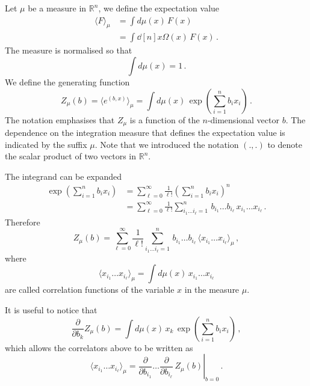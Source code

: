 \documentclass[notes.tex]{subfiles}
\begin{document}
Let $\mu$ be a measure in $\mathbb{R}^n$, we define the expectation value
\begin{align}
  \label{eq:ExpValMu}
  \langle F \rangle_\mu & = \int d\mu(x)\, F(x)                 \\
                        & = \int \dd[n]{x} \Omega(x)\, F(x)\, .
\end{align}
The measure is normalised so that
\begin{equation}
  \label{eq:MeasureNorm}
  \int d\mu(x) = 1\, .
\end{equation}
We define the generating function
\begin{equation}
  \label{eq:ZGenFunc}
  Z_\mu(b) = \langle e^{(b,x)}\rangle_\mu =
  \int d\mu(x)\, \exp\left(
  \sum_{i=1}^n b_i x_i
  \right)\, .
\end{equation}
The notation emphasises that $Z_\mu$ is a function of the $n$-dimensional vector $b$. The dependence on the integration measure that defines the expectation value is indicated by the suffix $\mu$. Note that we introduced the notation $(.,.)$ to denote the scalar product of two vectors in $\mathbb{R}^n$.

The integrand can be expanded
\begin{align}
  \exp\left(
  \sum_{i=1}^n b_i x_i
  \right) & =
  \sum_{\ell=0}^\infty \frac{1}{\ell!} \left(
  \sum_{i=1}^n b_i x_i
  \right)^n                                        \\
          & = \sum_{\ell=0}^\infty \frac{1}{\ell!}
  \sum_{i_1 \ldots i_\ell=1}^n \, b_{i_1} \ldots b_{i_\ell}\,
  x_{i_1} \ldots x_{i_\ell}\, .
\end{align}
Therefore
\begin{equation}
  \label{eq:ZExp}
  Z_\mu(b) =  \sum_{\ell=0}^\infty \frac{1}{\ell!}
  \sum_{i_1 \ldots i_\ell=1}^n \, b_{i_1} \ldots b_{i_\ell}\,
  \langle x_{i_1} \ldots x_{i_\ell}\rangle_\mu\, ,
\end{equation}
where
\begin{equation}
  \label{eq:XCorrel}
  \langle x_{i_1} \ldots x_{i_\ell}\rangle_\mu =
  \int d\mu(x)\, x_{i_1} \ldots x_{i_\ell}
\end{equation}
are called correlation functions of the variable $x$ in the measure $\mu$.

It is useful to notice that
\begin{equation}
  \label{eq:DiffGenFunct}
  \frac{\partial}{\partial b_k} Z_\mu(b) = \int d\mu(x)\, x_k\, \exp\left(
  \sum_{i=1}^n b_i x_i
  \right)\, ,
\end{equation}
which allows the correlators above to be written as
\begin{equation}
  \label{eq:DiffGenFunctCorr}
  \langle x_{i_1} \ldots x_{i_\ell}\rangle_\mu = \left.
  \frac{\partial}{\partial b_{i_1}} \ldots \frac{\partial}{\partial b_{i_\ell}}\,
  Z_\mu(b) \right|_{b=0}\, .
\end{equation}
\end{document}
